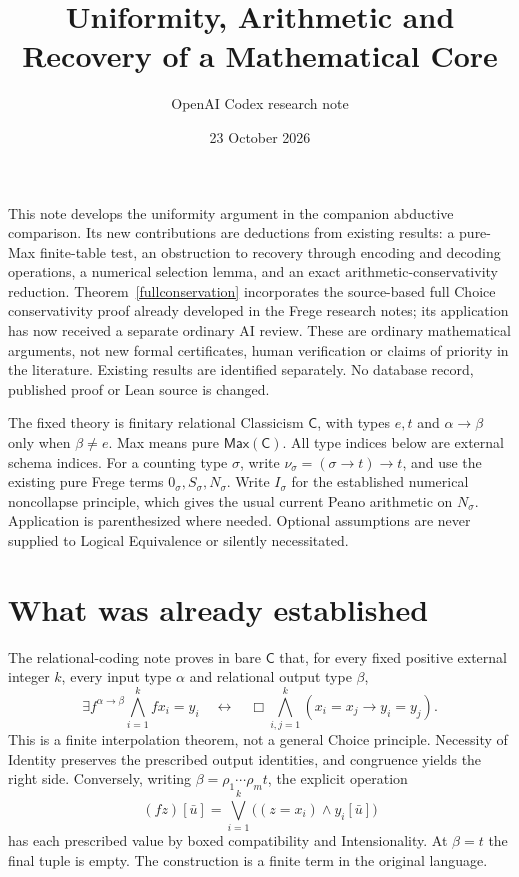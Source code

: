 \documentclass[11pt]{article}
\title{Uniformity, Arithmetic and Recovery of a Mathematical Core}
\author{OpenAI Codex research note}
\date{23 October 2026}
\newcommand{\C}{\mathsf C}
\newcommand{\Max}{\mathsf{Max}}
\begin{document}
\maketitle

This note develops the uniformity argument in the companion abductive comparison. Its new contributions are deductions from existing results: a pure-Max finite-table test, an obstruction to recovery through encoding and decoding operations, a numerical selection lemma, and an exact arithmetic-conservativity reduction. Theorem~\ref{fullconservation} incorporates the source-based full Choice conservativity proof already developed in the Frege research notes; its application has now received a separate ordinary AI review. These are ordinary mathematical arguments, not new formal certificates, human verification or claims of priority in the literature. Existing results are identified separately. No database record, published proof or Lean source is changed.

The fixed theory is finitary relational Classicism $\C$, with types $e,t$ and $\alpha\to\beta$ only when $\beta\ne e$. Max means pure $\Max(\C)$. All type indices below are external schema indices. For a counting type $\sigma$, write $\nu_\sigma=(\sigma\to t)\to t$, and use the existing pure Frege terms $0_\sigma,S_\sigma,N_\sigma$. Write $I_\sigma$ for the established numerical noncollapse principle, which gives the usual current Peano arithmetic on $N_\sigma$. Application is parenthesized where needed. Optional assumptions are never supplied to Logical Equivalence or silently necessitated.

\section{What was already established}

The relational-coding note \cite[\S13]{coding} proves in bare $\C$ that, for every fixed positive external integer $k$, every input type $\alpha$ and relational output type $\beta$,
\begin{equation}\label{finite}
 \exists f^{\alpha\to\beta}\bigwedge_{i=1}^{k}fx_i=y_i
 \quad\longleftrightarrow\quad
 \Box\bigwedge_{i,j=1}^{k}(x_i=x_j\to y_i=y_j).
\end{equation}
This is a finite interpolation theorem, not a general Choice principle. Necessity of Identity preserves the prescribed output identities, and congruence yields the right side. Conversely, writing $\beta=\rho_1\cdots\rho_m t$, the explicit operation
\[
 (fz)[\bar u]=\bigvee_{i=1}^{k}\bigl((z=x_i)\land y_i[\bar u]\bigr)
\]
has each prescribed value by boxed compatibility and Intensionality. At $\beta=t$ the final tuple is empty. The construction is a finite term in the original language.
\end{document}
